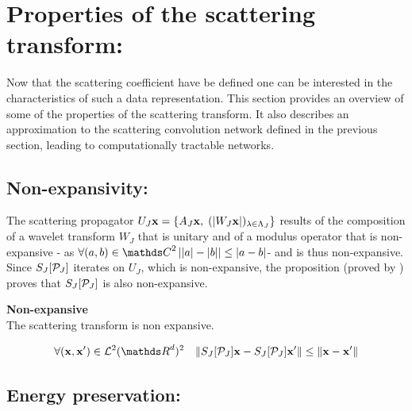 \documentclass[a4paper,11pt]{report}
\begin{document}
      
      
	\section{Properties of the scattering transform:}
		\label{sec:ST/Pties}
		
		Now that the scattering coefficient have be defined one can be interested in the characteristics of such a data representation. This section provides an overview of some of the properties of the scattering transform. It also describes an approximation to the scattering convolution network defined in the previous section, leading to computationally tractable networks. 

		\subsection{Non-expansivity:}
			\label{subsec:ST/Pties/Non-expansivity}
			
			The scattering propagator $U_{J} {\bf x} = \{ A_{J}{\bf x} , \; (\left| W_{J}{\bf x} \right|)_{\lambda \in \Lambda_{J}} \}$ results of the composition of a wavelet transform $W_{J}$ that is unitary and of a modulus operator that is non-expansive - as $\forall (a,b) \in \dsC^{2} \abs{\abs{a}-\abs{b}} \leq \abs{a-b}$- and is thus non-expansive. Since $S_{J}[\mathcal{P}_{J}]$ iterates on $U_{J}$, which is non-expansive, the proposition (proved by \cite{lohmiller1998contraction}) proves that $S_{J}[\mathcal{P}_{J}]$ is also non-expansive.
			
			\begin{prop} \textbf{Non-expansive}\\ 
				The scattering transform is non expansive.
				
				\begin{equation}
				  \forall (\bfx,\bfx') \in \mcalL^{2}(\dsR^{d})^{2} \;\;\; \norm{S_{J}[\mcalP_{J}]\bfx - S_{J}[\mcalP_{J}]\bfx'} \leq \norm{\bfx-\bfx'}
				\end{equation}

			  \label{pty:Nonexpansivity}
			\end{prop}

		\subsection{Energy preservation:}
			\label{subsec:ST/Pties/Energy}
			
\end{document}
